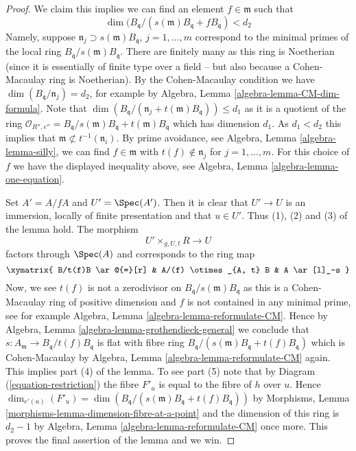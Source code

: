 \begin{proof}
\medskip\noindent
We claim this implies we can find
an element $f \in \mathfrak m$ such that
$$
\dim(B_{\mathfrak q}/(s(\mathfrak m)B_{\mathfrak q} + fB_{\mathfrak q}) < d_2
$$
Namely, suppose $\mathfrak n_j \supset s(\mathfrak m)B_{\mathfrak q}$,
$j = 1, \ldots, m$ correspond to the minimal primes of the local ring
$B_{\mathfrak q}/s(\mathfrak m)B_{\mathfrak q}$.
There are finitely many as this ring is Noetherian (since it is essentially
of finite type over a field -- but also because a Cohen-Macaulay ring is
Noetherian). By the Cohen-Macaulay condition we have
$\dim(B_{\mathfrak q}/\mathfrak n_j) = d_2$, for example by
Algebra, Lemma \ref{algebra-lemma-CM-dim-formula}.
Note that
$\dim(B_{\mathfrak q}/(\mathfrak n_j + t(\mathfrak m)B_{\mathfrak q}))
\leq d_1$
as it is a quotient of the ring
$\mathcal{O}_{R'', e''} =
B_{\mathfrak q}/s(\mathfrak m)B_{\mathfrak q} + t(\mathfrak m)B_{\mathfrak q}$
which has dimension $d_1$. As $d_1 < d_2$ this implies that
$\mathfrak m \not \subset t^{-1}(\mathfrak n_i)$.
By prime avoidance, see
Algebra, Lemma \ref{algebra-lemma-silly},
we can find $f \in \mathfrak m$ with $t(f) \not \in \mathfrak n_j$ for
$j = 1, \ldots, m$. For this choice of $f$ we have
the displayed inequality above, see
Algebra, Lemma \ref{algebra-lemma-one-equation}.

\medskip\noindent
Set $A' = A/fA$ and $U' = \Spec(A')$. Then it is clear that
$U' \to U$ is an immersion, locally of finite presentation
and that $u \in U'$. Thus (1), (2) and (3) of the lemma hold.
The morphism
$$
U' \times_{g, U, t} R \longrightarrow U
$$
factors through $\Spec(A)$ and corresponds to the ring map
$$
\xymatrix{
B/t(f)B \ar@{=}[r] & A/(f) \otimes_{A, t} B & A \ar[l]_-s
}
$$
Now, we see $t(f)$ is not a zerodivisor on
$B_{\mathfrak q}/s(\mathfrak m)B_{\mathfrak q}$ as this is a
Cohen-Macaulay ring of positive dimension and $f$ is not contained
in any minimal prime, see for example
Algebra, Lemma \ref{algebra-lemma-reformulate-CM}.
Hence by
Algebra, Lemma \ref{algebra-lemma-grothendieck-general}
we conclude that $s : A_{\mathfrak m} \to B_{\mathfrak q}/t(f)B_{\mathfrak q}$
is flat with fibre ring
$B_{\mathfrak q}/(s(\mathfrak m)B_{\mathfrak q} + t(f)B_{\mathfrak q})$
which is Cohen-Macaulay by
Algebra, Lemma \ref{algebra-lemma-reformulate-CM}
again. This implies part (4) of the lemma.
To see part (5) note that by Diagram (\ref{equation-restriction})
the fibre $F'_u$ is equal to the fibre of $h$ over $u$.
Hence
$\dim_{e'(u)}(F'_u) =
\dim(B_{\mathfrak q}/(s(\mathfrak m)B_{\mathfrak q} + t(f)B_{\mathfrak q}))$
by
Morphisms, Lemma \ref{morphisms-lemma-dimension-fibre-at-a-point}
and the dimension of this ring is $d_2 - 1$ by
Algebra, Lemma \ref{algebra-lemma-reformulate-CM}
once more. This proves the final assertion of the lemma and we win.
\end{proof}

